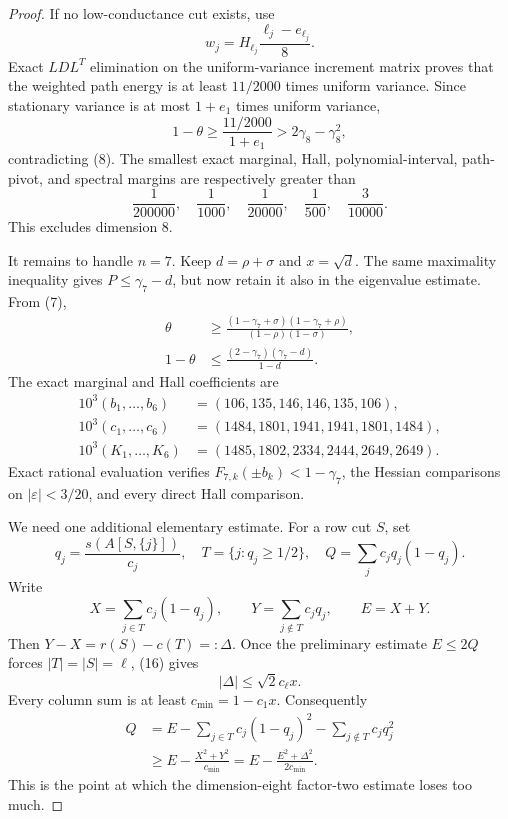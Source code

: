 \documentclass[11pt]{amsart}
\theoremstyle{definition}
\theoremstyle{remark}
\begin{document}
\begin{proof}
If no low-conductance cut exists, use
\[
w_j=H_{\ell_j}\frac{\ell_j-e_{\ell_j}}8.
\]
Exact \(LDL^T\) elimination on the uniform-variance increment matrix proves
that the weighted path energy is at least \(11/2000\) times uniform
variance. Since stationary variance is at most \(1+e_1\) times uniform
variance,
\[
1-\theta\geq\frac{11/2000}{1+e_1}
>2\gamma_8-\gamma_8^2,
\]
contradicting (8). The smallest exact marginal, Hall, polynomial-interval,
path-pivot, and spectral margins are respectively greater than
\[
\frac1{200000},\quad\frac1{1000},\quad
\frac1{20000},\quad\frac1{500},\quad
\frac3{10000}.
\]
This excludes dimension \(8\).

It remains to handle \(n=7\). Keep \(d=\rho+\sigma\) and \(x=\sqrt d\).
The same maximality inequality gives \(P\leq\gamma_7-d\), but now retain it
also in the eigenvalue estimate. From (7),
\[
\begin{split}
\theta&\geq
\frac{(1-\gamma_7+\sigma)(1-\gamma_7+\rho)}
     {(1-\rho)(1-\sigma)},\\
1-\theta&\leq
\frac{(2-\gamma_7)(\gamma_7-d)}{1-d}.
\end{split}                                         \tag{15}
\]
The exact marginal and Hall coefficients are
\[
\begin{split}
10^3(b_1,\ldots,b_6)&=(106,135,146,146,135,106),\\
10^3(c_1,\ldots,c_6)&=(1484,1801,1941,1941,1801,1484),\\
10^3(K_1,\ldots,K_6)&=(1485,1802,2334,2444,2649,2649).
\end{split}                                         \tag{16}
\]
Exact rational evaluation verifies \(F_{7,k}(\pm b_k)<1-\gamma_7\), the Hessian
comparisons on \(|\varepsilon|<3/20\), and every direct Hall comparison.

We need one additional elementary estimate. For a row cut \(S\), set
\[
 q_j=\frac{s(A[S,\{j\}])}{c_j},\quad
 T=\{j:q_j\geq1/2\},\quad
 Q=\sum_jc_jq_j(1-q_j).
\]
Write
\[
 X=\sum_{j\in T}c_j(1-q_j),\qquad
 Y=\sum_{j\notin T}c_jq_j,\qquad E=X+Y.
\]
Then \(Y-X=r(S)-c(T)=:\Delta\). Once the preliminary estimate
\(E\leq2Q\) forces \(|T|=|S|=\ell\), (16) gives
\[
 |\Delta|\leq\sqrt2c_\ell x.
\]
Every column sum is at least \(c_{\min}=1-c_1x\). Consequently
\[
\begin{split}
Q
&=E-\sum_{j\in T}c_j(1-q_j)^2
     -\sum_{j\notin T}c_jq_j^2\\
&\geq E-\frac{X^2+Y^2}{c_{\min}}
 =E-\frac{E^2+\Delta^2}{2c_{\min}}.
\end{split}                                         \tag{17}
\]
This is the point at which the dimension-eight factor-two estimate loses
too much.


\end{proof}
\end{document}
